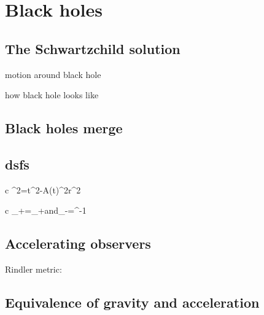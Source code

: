 \documentclass[11pt,oneside%
]{memoir}
\newenvironment{eqna}{\begin{IEEEeqnarray*}{c}}{\end{IEEEeqnarray*}\ignorespacesafterend}
\newcommand{\andd}{\qquad\textrm{and}\qquad}
\newcommand{\dd}{\mathrm{d}}
\begin{document}
\chapter{Black holes}

\section{The Schwartzchild solution}

motion around black hole

how black hole looks like

\section{Black holes merge}

\section{dsfs}

\begin{eqna}
\dd\tau^2=\dd t^2-A(t)^2\dd r^2
\end{eqna}

\begin{eqna}
\sigma_+\rightarrow\tilde{\sigma_+}=\eta\sigma_+\andd\sigma_-\rightarrow\tilde{\sigma_+}=\eta^{-1}\sigma
\end{eqna}

\section{Accelerating observers}

Rindler metric:



\section{Equivalence of gravity and acceleration}








\end{document}
